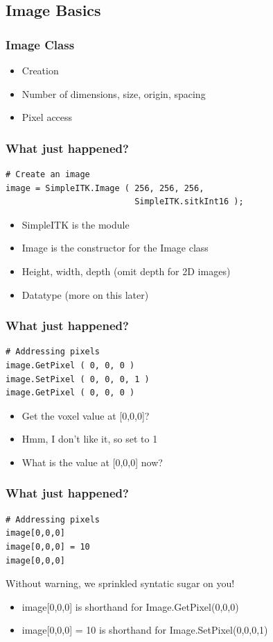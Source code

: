 \subsection{Image Basics}

\begin{frame}
\frametitle{Image Class}
\begin{itemize}
  \item Creation
  \item Number of dimensions, size, origin, spacing
  \item Pixel access
\end{itemize}
\end{frame}

\begin{frame}[fragile]
\frametitle{What just happened?}
\lstpython
\begin{lstlisting}
# Create an image
image = SimpleITK.Image ( 256, 256, 256,
                          SimpleITK.sitkInt16 );
\end{lstlisting}

\begin{itemize}
  \item SimpleITK is the module
  \item Image is the constructor for the Image class
  \item Height, width, depth (omit depth for 2D images)
  \item Datatype (more on this later)
\end{itemize}

\end{frame}


\begin{frame}[fragile]
\frametitle{What just happened?}
\lstpython
\begin{lstlisting}
# Addressing pixels
image.GetPixel ( 0, 0, 0 )
image.SetPixel ( 0, 0, 0, 1 )
image.GetPixel ( 0, 0, 0 )
\end{lstlisting}
\begin{itemize}
  \item Get the voxel value at [0,0,0]?
  \item Hmm, I don't like it, so set to 1
  \item What is the value at [0,0,0] now?
\end{itemize}
\end{frame}

\begin{frame}[fragile]
\frametitle{What just happened?}
\lstpython
\begin{lstlisting}
# Addressing pixels
image[0,0,0]
image[0,0,0] = 10
image[0,0,0]
\end{lstlisting}
Without warning, we sprinkled syntatic sugar on you!
\begin{itemize}
  \item image[0,0,0] is shorthand for Image.GetPixel(0,0,0)
  \item image[0,0,0] = 10 is shorthand for Image.SetPixel(0,0,0,1)
\end{itemize}
\end{frame}

